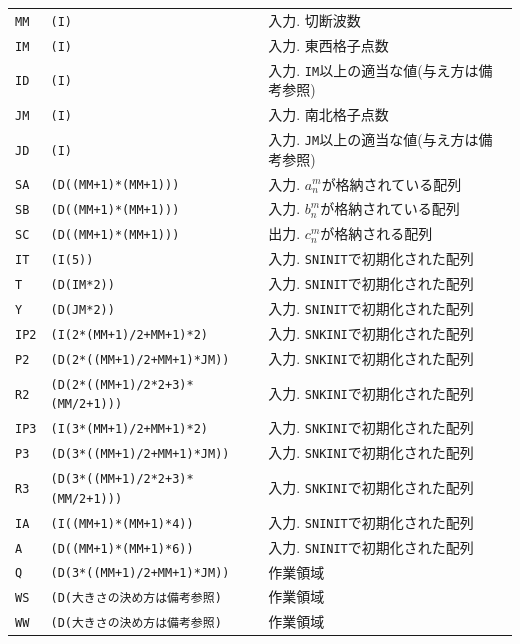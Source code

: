 \documentclass[a4j,fleqn]{jarticle}
\begin{document}
\begin{enumerate}
\begin{tabular}{lll}
{\tt MM} & {\tt (I)} & 入力. 切断波数\\
{\tt IM} & {\tt (I)} & 入力. 東西格子点数\\
{\tt ID} & {\tt (I)} & 入力. {\tt IM}以上の適当な値(与え方は備考参照)\\
{\tt JM} & {\tt (I)} & 入力. 南北格子点数\\
{\tt JD} & {\tt (I)} & 入力. {\tt JM}以上の適当な値(与え方は備考参照)\\
{\tt SA} & {\tt (D((MM+1)*(MM+1)))} 
& 入力. $a^m_n$が格納されている配列\\
{\tt SB} & {\tt (D((MM+1)*(MM+1)))} 
& 入力. $b^m_n$が格納されている配列\\
{\tt SC} & {\tt (D((MM+1)*(MM+1)))} 
& 出力. $c^m_n$が格納される配列\\
{\tt IT}  & {\tt (I(5))}    & 入力. {\tt SNINIT}で初期化された配列\\
{\tt T}   & {\tt (D(IM*2))} & 入力. {\tt SNINIT}で初期化された配列\\
{\tt Y}   & {\tt (D(JM*2))} & 入力. {\tt SNINIT}で初期化された配列\\
{\tt IP2}  & {\tt (I(2*(MM+1)/2+MM+1)*2)} 
             & 入力. {\tt SNKINI}で初期化された配列\\
{\tt P2}  & {\tt (D(2*((MM+1)/2+MM+1)*JM))} 
             & 入力. {\tt SNKINI}で初期化された配列\\
{\tt R2}  & {\tt (D(2*((MM+1)/2*2+3)*(MM/2+1)))}
             & 入力. {\tt SNKINI}で初期化された配列\\
{\tt IP3}  & {\tt (I(3*(MM+1)/2+MM+1)*2)} 
             & 入力. {\tt SNKINI}で初期化された配列\\
{\tt P3}  & {\tt (D(3*((MM+1)/2+MM+1)*JM))} 
             & 入力. {\tt SNKINI}で初期化された配列\\
{\tt R3}  & {\tt (D(3*((MM+1)/2*2+3)*(MM/2+1)))} 
             & 入力. {\tt SNKINI}で初期化された配列\\
{\tt IA}  & {\tt (I((MM+1)*(MM+1)*4))} 
             & 入力. {\tt SNINIT}で初期化された配列\\
{\tt A}  & {\tt (D((MM+1)*(MM+1)*6))}
             & 入力. {\tt SNINIT}で初期化された配列\\
{\tt Q}  & {\tt (D(3*((MM+1)/2+MM+1)*JM))} 
             & 作業領域\\
{\tt WS}  & {\tt (D(大きさの決め方は備考参照)} & 作業領域\\
{\tt WW}  & {\tt (D(大きさの決め方は備考参照)} & 作業領域
\end{tabular}


\end{enumerate}
\end{document}
